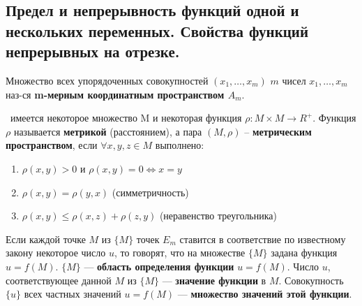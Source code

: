\subsection{Предел и непрерывность функций одной и нескольких переменных. Свойства функций  непрерывных на отрезке.}

Множество всех упорядоченных совокупностей $(x_1,\dots,x_m)$ $m$ чисел $x_1,\dots,x_m$ наз-ся \textbf{m-мерным координатным пространством $A_m$}.

\bigbreak
\mathLet \ имеется  некоторое множество M и некоторая функция $\rho : M \times M \rightarrow R^+$. Функция $\rho$ называется \textbf{метрикой} (расстоянием), а пара $(M, \rho)$ -- \textbf{метрическим пространством}, если $\forall x, y, z \in M$ выполнено:
\begin{enumerate}
    \item $\rho(x, y) > 0$ и $\rho(x, y) = 0 \Leftrightarrow  x = y$
    \item $\rho(x, y) = \rho(y, x)$ (симметричность)
    \item $\rho(x, y) \leq \rho(x, z) + \rho(z, y)$ (неравенство треугольника)
\end{enumerate}

\bigbreak
Если каждой точке $M$ из $\{M\}$ точек $E_m$ ставится в соответствие по известному закону некоторое число $u$, то говорят, что на множестве $\{M\}$ задана функция $u = f(M)$. $\{M\}$ --- \textbf{область определения функции} $u = f(M)$. Число $u$, соответствующее данной $M$ из $\{M\}$ ---\textbf{ значение функции} в $M$. Совокупность $\{u\}$ всех частных значений $u = f(M)$ --- \textbf{множество значений этой функции}.


